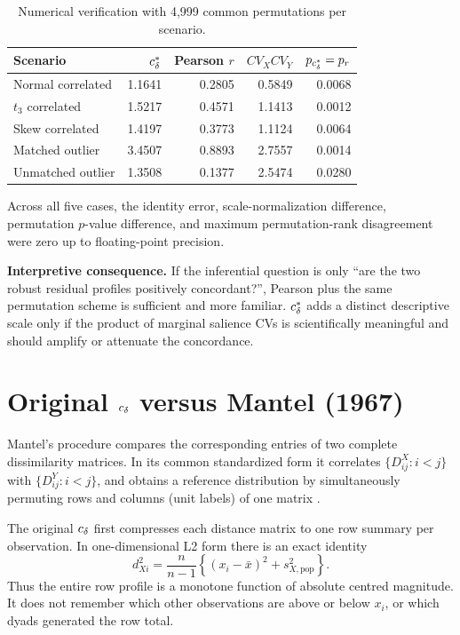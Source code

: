 \begin{table}[ht]
\centering
\caption{Numerical verification with 4,999 common permutations per scenario.}
\small
\begin{tabular}{lrrrr}
\hline
Scenario & $c_\delta^\ast$ & Pearson $r$ & $CV_XCV_Y$ & $p_{c_\delta^\ast}=p_r$\\
\hline
Normal correlated & 1.1641 & 0.2805 & 0.5849 & 0.0068\\
$t_3$ correlated & 1.5217 & 0.4571 & 1.1413 & 0.0012\\
Skew correlated & 1.4197 & 0.3773 & 1.1124 & 0.0064\\
Matched outlier & 3.4507 & 0.8893 & 2.7557 & 0.0014\\
Unmatched outlier & 1.3508 & 0.1377 & 2.5474 & 0.0280\\
\hline
\end{tabular}
\end{table}

Across all five cases, the identity error, scale-normalization difference,
permutation $p$-value difference, and maximum permutation-rank disagreement
were zero up to floating-point precision.

\textbf{Interpretive consequence.} If the inferential question is only
``are the two robust residual profiles positively concordant?'', Pearson plus
the same permutation scheme is sufficient and more familiar. $c_\delta^\ast$ adds a
distinct descriptive scale only if the product of marginal salience CVs is
scientifically meaningful and should amplify or attenuate the concordance.

\section{Original $c_\delta$ versus Mantel (1967)}

Mantel's procedure compares the corresponding entries of two complete
dissimilarity matrices. In its common standardized form it correlates
\(\{D^X_{ij}:i<j\}\) with \(\{D^Y_{ij}:i<j\}\), and obtains a reference
distribution by simultaneously permuting rows and columns (unit labels) of
one matrix \cite{mantel1967,shi2024}.

The original $c_\delta$ first compresses each distance matrix to one row summary
per observation. In one-dimensional L2 form there is an exact identity
\begin{equation}
d_{Xi}^2=\frac{n}{n-1}\left\{(x_i-\bar x)^2+s_{X,\mathrm{pop}}^2\right\}.
\label{eq:l2row}
\end{equation}
Thus the entire row profile is a monotone function of absolute centred
magnitude. It does not remember which other observations are above or below
$x_i$, or which dyads generated the row total.

